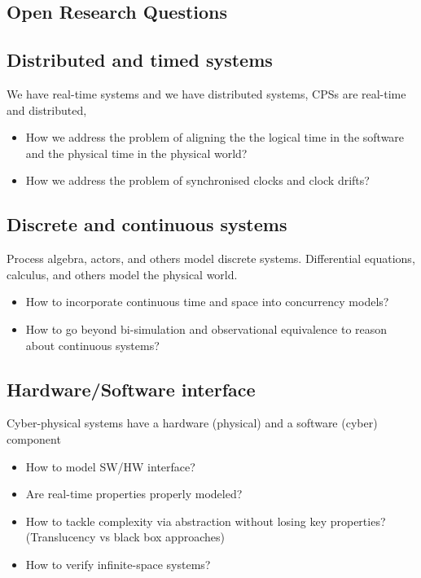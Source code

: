 \documentclass[
graybox,
envcountchap
]{svmult}
\begin{document}
\begin{bibunit}
\section{Open Research Questions} %

   \subsection{Distributed and timed systems}
   
   We have real-time systems and we have distributed systems, CPSs are real-time and distributed, 
   \begin{itemize}
    \item How we address the problem of aligning the  the logical time in the software and the physical time in the physical world? 
    \item How we address the problem of synchronised clocks and clock drifts?
    \end{itemize}
   
    \subsection{Discrete and continuous systems}

    Process algebra, actors, and others model discrete systems.
    Differential equations, calculus, and others model the physical world.

    \begin{itemize}
    \item How to incorporate continuous time and space into concurrency models?
    \item How to go beyond bi-simulation and observational equivalence to reason about continuous systems?
    \end{itemize}
    
    \subsection{Hardware/Software interface}

    Cyber-physical systems have a hardware (physical) and a software (cyber) component
    
    \begin{itemize}
    \item How to model SW/HW interface?
    \item Are real-time properties properly modeled?
    \item  How to tackle complexity via abstraction without losing key properties?  (Translucency vs black box approaches)
    \item How to verify infinite-space systems?
    \end{itemize}


\end{bibunit}
\end{document}
